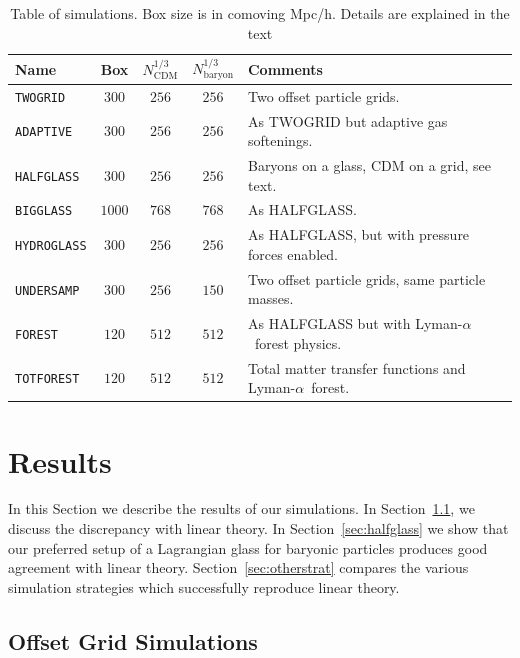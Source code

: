 \documentclass[a4paper,11pt]{article}
\newcommand{\Lya}{Lyman-$\alpha$}
\begin{document}
\begin{table}
\begin{center}
\begin{tabular}{|l|c|c|c|l|}
\hline
Name & Box & $N_\mathrm{CDM}^{1/3}$ & $N_\mathrm{baryon}^{1/3}$ & Comments  \\
\hline
\texttt{TWOGRID}    &   $300$ & $256$ & $256$ & Two offset particle grids. \\
\texttt{ADAPTIVE}    &   $300$ & $256$ & $256$ & As TWOGRID but adaptive gas softenings. \\
\texttt{HALFGLASS}  &   $300$ & $256$ & $256$ & Baryons on a glass, CDM on a grid, see text. \\
\texttt{BIGGLASS}  &   $1000$ & $768$ & $768$ & As HALFGLASS. \\
\texttt{HYDROGLASS}  &   $300$ & $256$ & $256$ & As HALFGLASS, but with pressure forces enabled. \\
\texttt{UNDERSAMP}  &   $300$ & $256$ & $150$ & Two offset particle grids, same particle masses. \\
\texttt{FOREST}  &   $120$ & $512$ & $512$ & As HALFGLASS but with \Lya~forest physics. \\
\texttt{TOTFOREST}  &   $120$ & $512$ & $512$ & Total matter transfer functions and \Lya~forest. \\
\hline
\end{tabular}
\end{center}
\caption{Table of simulations. Box size is in comoving Mpc/h. Details are explained in the text}
\label{tab:simulations}
\end{table}

\section{Results}
\label{sec:results}

In this Section we describe the results of our simulations. In Section~\ref{sec:offsetgrid}, we discuss the discrepancy with linear theory. In Section~\ref{sec:halfglass} we show that our preferred setup of a Lagrangian glass for baryonic particles produces good agreement with linear theory. Section~\ref{sec:otherstrat} compares the various simulation strategies which successfully reproduce linear theory.

\subsection{Offset Grid Simulations}
\label{sec:offsetgrid}
\end{document}
